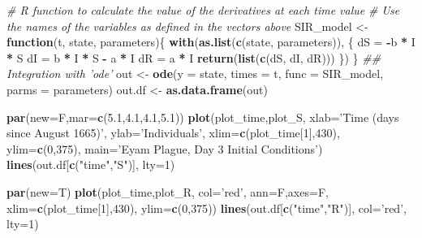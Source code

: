 \documentclass[
]{article}
\newenvironment{Shaded}{\begin{snugshade}}{\end{snugshade}}
\newcommand{\CommentTok}[1]{\textcolor[rgb]{0.56,0.35,0.01}{\textit{#1}}}
\newcommand{\ControlFlowTok}[1]{\textcolor[rgb]{0.13,0.29,0.53}{\textbf{#1}}}
\newcommand{\DataTypeTok}[1]{\textcolor[rgb]{0.13,0.29,0.53}{#1}}
\newcommand{\DecValTok}[1]{\textcolor[rgb]{0.00,0.00,0.81}{#1}}
\newcommand{\FloatTok}[1]{\textcolor[rgb]{0.00,0.00,0.81}{#1}}
\newcommand{\KeywordTok}[1]{\textcolor[rgb]{0.13,0.29,0.53}{\textbf{#1}}}
\newcommand{\NormalTok}[1]{#1}
\newcommand{\OperatorTok}[1]{\textcolor[rgb]{0.81,0.36,0.00}{\textbf{#1}}}
\newcommand{\StringTok}[1]{\textcolor[rgb]{0.31,0.60,0.02}{#1}}
\begin{document}
\begin{Shaded}
\begin{Highlighting}[]
\CommentTok{# R function to calculate the value of the derivatives at each time value}
\CommentTok{# Use the names of the variables as defined in the vectors above}
\NormalTok{SIR_model <-}\StringTok{ }\ControlFlowTok{function}\NormalTok{(t, state, parameters)\{}
  \KeywordTok{with}\NormalTok{(}\KeywordTok{as.list}\NormalTok{(}\KeywordTok{c}\NormalTok{(state, parameters)), \{}
\NormalTok{    dS =}\StringTok{ }\OperatorTok{-}\NormalTok{b }\OperatorTok{*}\StringTok{ }\NormalTok{I }\OperatorTok{*}\StringTok{ }\NormalTok{S}
\NormalTok{    dI =}\StringTok{ }\NormalTok{b }\OperatorTok{*}\StringTok{ }\NormalTok{I }\OperatorTok{*}\StringTok{ }\NormalTok{S }\OperatorTok{-}\StringTok{ }\NormalTok{a }\OperatorTok{*}\StringTok{ }\NormalTok{I}
\NormalTok{    dR =}\StringTok{ }\NormalTok{a }\OperatorTok{*}\StringTok{ }\NormalTok{I}
    \KeywordTok{return}\NormalTok{(}\KeywordTok{list}\NormalTok{(}\KeywordTok{c}\NormalTok{(dS, dI, dR)))}
\NormalTok{  \})}
\NormalTok{\}}
\CommentTok{## Integration with 'ode'}
\NormalTok{out <-}\StringTok{ }\KeywordTok{ode}\NormalTok{(}\DataTypeTok{y =}\NormalTok{ state, }\DataTypeTok{times =}\NormalTok{ t, }\DataTypeTok{func =}\NormalTok{ SIR_model, }\DataTypeTok{parms =}\NormalTok{ parameters)}
\NormalTok{out.df <-}\StringTok{ }\KeywordTok{as.data.frame}\NormalTok{(out)}

\KeywordTok{par}\NormalTok{(}\DataTypeTok{new=}\NormalTok{F,}\DataTypeTok{mar=}\KeywordTok{c}\NormalTok{(}\FloatTok{5.1}\NormalTok{,}\FloatTok{4.1}\NormalTok{,}\FloatTok{4.1}\NormalTok{,}\FloatTok{5.1}\NormalTok{))}
\KeywordTok{plot}\NormalTok{(plot_time,plot_S,}
     \DataTypeTok{xlab=}\StringTok{'Time (days since August 1665)'}\NormalTok{,}
     \DataTypeTok{ylab=}\StringTok{'Individuals'}\NormalTok{,}
     \DataTypeTok{xlim=}\KeywordTok{c}\NormalTok{(plot_time[}\DecValTok{1}\NormalTok{],}\DecValTok{430}\NormalTok{), }\DataTypeTok{ylim=}\KeywordTok{c}\NormalTok{(}\DecValTok{0}\NormalTok{,}\DecValTok{375}\NormalTok{),}
     \DataTypeTok{main=}\StringTok{'Eyam Plague, Day 3 Initial Conditions'}\NormalTok{)}
\KeywordTok{lines}\NormalTok{(out.df[}\KeywordTok{c}\NormalTok{(}\StringTok{"time"}\NormalTok{,}\StringTok{"S"}\NormalTok{)], }\DataTypeTok{lty=}\DecValTok{1}\NormalTok{)}

\KeywordTok{par}\NormalTok{(}\DataTypeTok{new=}\NormalTok{T)}
\KeywordTok{plot}\NormalTok{(plot_time,plot_R, }\DataTypeTok{col=}\StringTok{'red'}\NormalTok{, }
     \DataTypeTok{ann=}\NormalTok{F,}\DataTypeTok{axes=}\NormalTok{F, }
     \DataTypeTok{xlim=}\KeywordTok{c}\NormalTok{(plot_time[}\DecValTok{1}\NormalTok{],}\DecValTok{430}\NormalTok{), }\DataTypeTok{ylim=}\KeywordTok{c}\NormalTok{(}\DecValTok{0}\NormalTok{,}\DecValTok{375}\NormalTok{))}
\KeywordTok{lines}\NormalTok{(out.df[}\KeywordTok{c}\NormalTok{(}\StringTok{"time"}\NormalTok{,}\StringTok{"R"}\NormalTok{)], }\DataTypeTok{col=}\StringTok{'red'}\NormalTok{, }\DataTypeTok{lty=}\DecValTok{1}\NormalTok{)}


\end{Highlighting}
\end{Shaded}
\end{document}
